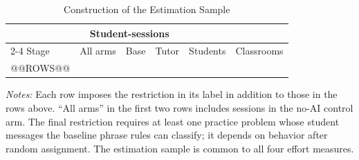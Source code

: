 \begin{table}[htbp]
\centering
\begingroup
{}
\small
\setlength{\tabcolsep}{5pt}
\caption{Construction of the Estimation Sample}
\label{tab:sample}
\begin{tabular}{lrrrrr}
\toprule
 & \multicolumn{3}{c}{Student-sessions} & & \\
\cmidrule(lr){2-4}
Stage & All arms & Base & Tutor & Students & Classrooms \\
\midrule
@@ROWS@@
\bottomrule
\end{tabular}
\par\medskip
\begin{minipage}{\linewidth}
\footnotesize
\textit{Notes:} Each row imposes the restriction in its label in addition to those in the rows above. ``All arms'' in the first two rows includes sessions in the no-AI control arm. The final restriction requires at least one practice problem whose student messages the baseline phrase rules can classify; it depends on behavior after random assignment. The estimation sample is common to all four effort measures.
\end{minipage}
\endgroup
\end{table}
